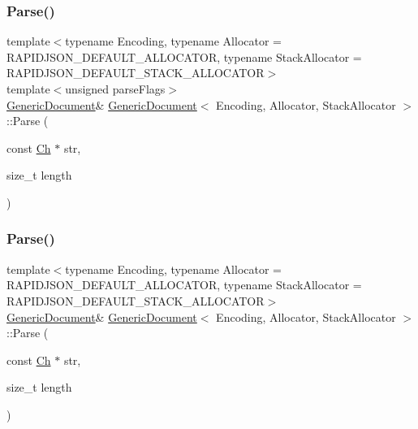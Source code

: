 \mbox{\label{classGenericDocument_a93fec16eacec4f4b42075bb3bc242a6b}} 
\subsubsection{\texorpdfstring{Parse()}{Parse()}\hspace{0.1cm}{\footnotesize\ttfamily [5/6]}}
{\footnotesize\ttfamily template$<$typename Encoding, typename Allocator = R\+A\+P\+I\+D\+J\+S\+O\+N\+\_\+\+D\+E\+F\+A\+U\+L\+T\+\_\+\+A\+L\+L\+O\+C\+A\+T\+OR, typename Stack\+Allocator = R\+A\+P\+I\+D\+J\+S\+O\+N\+\_\+\+D\+E\+F\+A\+U\+L\+T\+\_\+\+S\+T\+A\+C\+K\+\_\+\+A\+L\+L\+O\+C\+A\+T\+OR$>$ \\
template$<$unsigned parse\+Flags$>$ \\
\hyperlink{classGenericDocument}{Generic\+Document}\& \hyperlink{classGenericDocument}{Generic\+Document}$<$ Encoding, Allocator, Stack\+Allocator $>$\+::Parse (\begin{DoxyParamCaption}\item[{const \hyperlink{classGenericValue_ade0e0ce64ccd5d852da57a35e720bafb}{Ch} $\ast$}]{str,  }\item[{size\+\_\+t}]{length }\end{DoxyParamCaption})\hspace{0.3cm}{\ttfamily [inline]}}

\mbox{\label{classGenericDocument_ab13d8358acc0648e3f91f6b825365e4f}} 
\subsubsection{\texorpdfstring{Parse()}{Parse()}\hspace{0.1cm}{\footnotesize\ttfamily [6/6]}}
{\footnotesize\ttfamily template$<$typename Encoding, typename Allocator = R\+A\+P\+I\+D\+J\+S\+O\+N\+\_\+\+D\+E\+F\+A\+U\+L\+T\+\_\+\+A\+L\+L\+O\+C\+A\+T\+OR, typename Stack\+Allocator = R\+A\+P\+I\+D\+J\+S\+O\+N\+\_\+\+D\+E\+F\+A\+U\+L\+T\+\_\+\+S\+T\+A\+C\+K\+\_\+\+A\+L\+L\+O\+C\+A\+T\+OR$>$ \\
\hyperlink{classGenericDocument}{Generic\+Document}\& \hyperlink{classGenericDocument}{Generic\+Document}$<$ Encoding, Allocator, Stack\+Allocator $>$\+::Parse (\begin{DoxyParamCaption}\item[{const \hyperlink{classGenericValue_ade0e0ce64ccd5d852da57a35e720bafb}{Ch} $\ast$}]{str,  }\item[{size\+\_\+t}]{length }\end{DoxyParamCaption})\hspace{0.3cm}{\ttfamily [inline]}}

